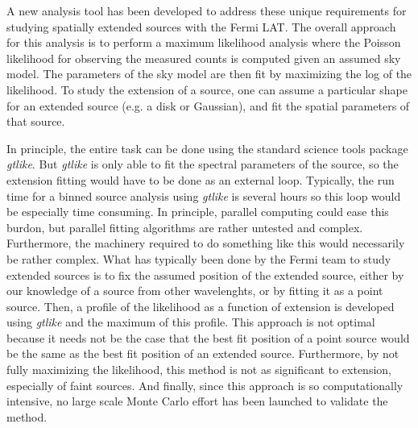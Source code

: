 \documentclass[preprint]{aastex}
\newcommand{\gtlike}{{\em gtlike}\xspace}
\begin{document}
A new analysis tool has been developed to address these unique
requirements for studying spatially extended sources with the Fermi
LAT. The overall approach for this analysis is to perform a maximum
likelihood analysis where the Poisson likelihood for observing the
measured counts is computed given an assumed sky model. The parameters
of the sky model are then fit by maximizing the log of the likelihood.
To study the extension of a source, one can assume a particular shape
for an extended source (e.g. a disk or Gaussian), and fit the spatial
parameters of that source.

In principle, the entire task can be done using the standard science
tools package \gtlike\cite{Science-Tools-gtlike}. But \gtlike is
only able to fit the spectral parameters of the source, so the extension
fitting would have to be done as an external loop. Typically, the run time
for a binned source analysis using \gtlike is several hours so this loop
would be especially time consuming. In principle, parallel computing could
ease this burdon, but parallel fitting algorithms are rather untested
and complex. Furthermore, the machinery required to do something like
this would necessarily be rather complex. What has typically been done by
the Fermi team to study extended sources is to fix the assumed position
of the extended source, either by our knowledge of a source from other
wavelenghts, or by fitting it as a point source. Then, a profile of the
likelihood as a function of extension is developed using \gtlike
and the maximum of this profile. This approach is not optimal because it
needs not be the case that the best fit position of a point source would
be the same as the best fit position of an extended source. Furthermore,
by not fully maximizing the likelihood, this method is not as significant to
extension, especially of faint sources. And finally, since this approach
is so computationally intensive, no large scale Monte Carlo effort has been
launched to validate the method.
\end{document}
